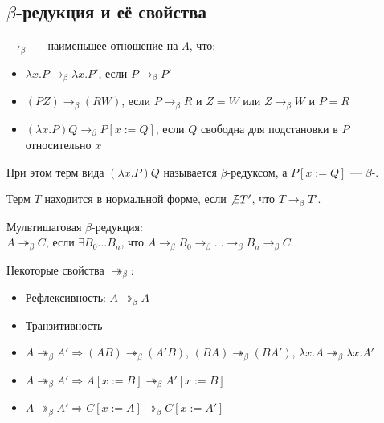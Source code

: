 \subsection{$\beta$-редукция и её свойства}
\label{sec-2-3}
\begin{definition}
$\to_\beta$ --- наименьшее отношение на $\Lambda$, что:
\begin{itemize}
\item $\lambda x . P \to_\beta \lambda x . P'$, если $P \to_\beta P'$
\item $(P Z) \to_\beta (R W)$, если $P \to_\beta R$ и $Z = W$ или 
$Z \to_\beta W$ и $P = R$
\item $(\lambda x . P) Q \to_\beta P[x:=Q]$, если $Q$ свободна для
подстановки в $P$ относительно $x$
\end{itemize}
При этом терм вида $(\lambda x . P) Q$ называется $\beta$-редуксом,
а $P[x:=Q]$ --- $\beta$-.
\end{definition}
\begin{definition}
Терм $T$ находится в нормальной форме, если $\not \exists T'$, что $T \to_\beta T'$.
\end{definition}
\begin{definition}
Мультишаговая $\beta$-редукция: \\
$A \twoheadrightarrow_\beta C$, если $\exists B_0 \dots B_n$, что
$A \to_\beta B_0 \to_\beta \dots \to_\beta B_n \to_\beta C$.
\end{definition}
Некоторые свойства $\twoheadrightarrow_\beta$:
\begin{itemize}
\item Рефлексивность: $A \twoheadrightarrow_\beta A$
\item Транзитивность
\item $A \twoheadrightarrow_\beta A' \Rightarrow
(A B) \twoheadrightarrow_\beta (A' B)$,
$(B A) \twoheadrightarrow_\beta (B A')$,
$\lambda x . A \twoheadrightarrow_\beta \lambda x . A'$
\item $A \twoheadrightarrow_\beta A' \Rightarrow
A[x:=B] \twoheadrightarrow_\beta A'[x:=B]$
\item $A \twoheadrightarrow_\beta A' \Rightarrow
C[x:=A] \twoheadrightarrow_\beta C[x:=A']$
\end{itemize}
